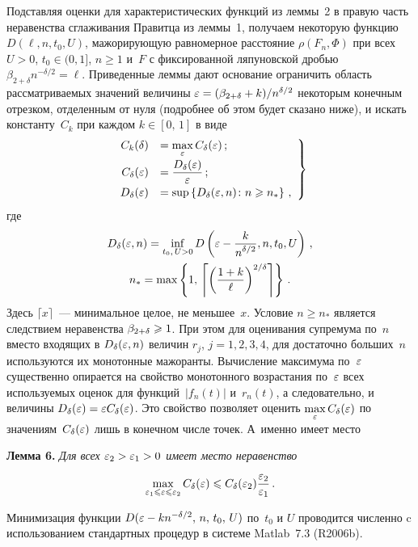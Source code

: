\begin{multicols}{2}
Подставляя оценки для характеристических функций из леммы~2 в правую часть 
неравенства сглаживания Правитца из леммы~1, получаем некоторую функцию 
$D(\ell,n,t_0,U)$, мажорирующую равномерное расстояние 
$\rho(F_n,\Phi)$ при всех $U>0$, $t_0\in(0,1]$, $n\geqslant1$ и~$F$ 
с фиксированной ляпуновской дробью $\beta_{2+\delta}n^{-\delta/2}=\ell$.
Приведенные леммы дают основание ограничить область рассматриваемых
значений величины $\varepsilon=(\beta_{2+\delta}+k)/n^{\delta/2}$ некоторым конечным
отрезком, отделенным от нуля (подробнее об этом будет сказано ниже),
и искать константу~$C_k$ при каждом $k\in[0,\,1]$ в виде
\begin{equation}
\left.
\begin{array}{rl}
C_k(\delta)&=\max\limits_{\varepsilon}C_\delta(\varepsilon)\,;\\[6pt]
C_\delta(\varepsilon)&=\displaystyle\frac{\displaystyle D_\delta(\varepsilon)\mathstrut}{\displaystyle \varepsilon\mathstrut}\,;\\[6pt]
D_\delta(\varepsilon)&=\sup\left\{D_\delta(\varepsilon,n)\colon n\geqslant n_*\right\}\,,
\end{array}
\right \}
\label{FormMax}
\end{equation}
где
\begin{gather*}
D_\delta(\varepsilon,n) =\inf\limits_{t_0,\,U>0} D\left(\varepsilon-\displaystyle\frac{\displaystyle k\mathstrut}{\displaystyle n^{\delta/2}\mathstrut},n,t_0,U\right)\,,\\
n_*=\max\left\{1,\,\left\lceil\left(\displaystyle\frac{\displaystyle 1+k\mathstrut}{\displaystyle \ell\mathstrut}\right)^{2/\delta}\right\rceil\right\}\,.
\end{gather*}
Здесь $\lceil x\rceil$~--- минимальное целое, не меньшее~$x$. Условие
$n\ge n_*$ является следствием неравенства $\beta_{2+\delta}\geqslant1$. При этом для
оценивания супремума по~$n$ вместо входящих в $D_\delta(\varepsilon,n)$ величин
$r_j$, $j=1,2,3,4$, для достаточно больших~$n$ используются их
монотонные мажоранты. Вычисление максимума по~$\varepsilon$ существенно
опирается на свойство монотонного возрастания по~$\varepsilon$ всех
используемых оценок для функций~$|f_n(t)|$ и~$r_n(t)$, а
следовательно, и величины $D_\delta(\varepsilon)=\varepsilon C_\delta(\varepsilon)$. Это свойство
позволяет оценить $\max\limits_{\varepsilon}C_\delta(\varepsilon)$ по значениям~$C_\delta(\varepsilon)$
лишь в конечном числе точек. А~именно имеет место

\medskip

\noindent
\textbf{Лемма 6.} %
\textit{Для всех $\varepsilon_2>\varepsilon_1>0$ имеет место неравенство}
$$
\max\limits_{\varepsilon_1\leqslant\varepsilon\leqslant\varepsilon_2}C_\delta(\varepsilon)\leqslant
C_\delta(\varepsilon_2)\displaystyle\frac{\displaystyle \varepsilon_2\mathstrut}{\displaystyle \varepsilon_1\mathstrut}\,.
$$

\medskip

Минимизация функции $D(\varepsilon-k{n}^{-\delta/2},\,n,\,t_0,\,U)$ по~$t_0$ и
$U$ проводится численно c использованием стандартных процедур в
системе Matlab~7.3 (R2006b).


\end{multicols}

